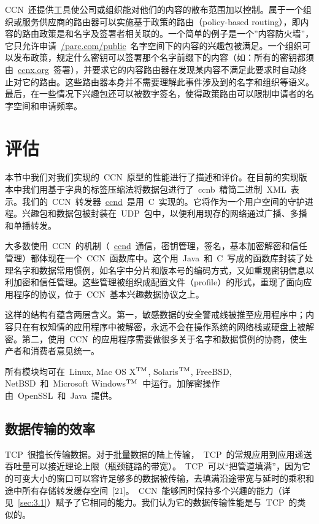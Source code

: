 CCN~还提供工具使公司或组织能对他们的内容的散布范围加以控制。属于一个组织或服务供应商的路由器可以实施基于政策的路由（policy-based routing），即内容的路由政策是和名字及签署者相关联的。一个简单的例子是一个”内容防火墙”，它只允许申请~\url{/parc.com/public}~名字空间下的内容的兴趣包被满足。一个组织可以发布政策，规定什么密钥可以签署那个名字前缀下的内容（如：所有的密钥都须由~\url{ccnx.org}~签署），并要求它的内容路由器在发现某内容不满足此要求时自动终止对它的路由。这些路由器本身并不需要理解此事件涉及到的名字和组织等语义。最后，在一些情况下兴趣包还可以被数字签名，使得政策路由可以限制申请者的名字空间和申请频率。

\section{评估}
\label{sec:6}
本节中我们对我们实现的~CCN~原型的性能进行了描述和评价。在目前的实现版本中我们用基于字典的标签压缩法将数据包进行了~ccnb~精简二进制~XML~表示。我们的~CCN~转发器~\url{ccnd}~是用~C~实现的。它将作为一个用户空间的守护进程。兴趣包和数据包被封装在~UDP~包中，以便利用现存的网络通过广播、多播和单播转发。

大多数使用~CCN~的机制（~\url{ccnd}~通信，密钥管理，签名，基本加密解密和信任管理）都体现在一个~CCN~函数库中。这个用~Java~和~C~写成的函数库封装了处理名字和数据常用惯例，如名字中分片和版本号的编码方式，又如重现密钥信息以利加密和信任管理。这些管理被组织成配置文件（profile）的形式，重现了面向应用程序的协议，位于~CCN~基本兴趣数据协议之上。

这样的结构有蕴含两层含义。第一，敏感数据的安全警戒线被推至应用程序中；内容只在有权知情的应用程序中被解密，永远不会在操作系统的网络栈或硬盘上被解密。第二，使用~CCN~的应用程序需要做很多关于名字和数据惯例的协商，使生产者和消费者意见统一。

\def\tm{\leavevmode\hbox{$\rm {}^{TM}$}} %
所有模块均可在~Linux, Mac OS X\tm, Solaris\tm, FreeBSD, NetBSD~和~Microsoft Windows\tm~中运行。加解密操作由~OpenSSL~和~Java~提供。

\subsection{数据传输的效率}
\label{sec:6.1}
TCP~很擅长传输数据。对于批量数据的陆上传输，~TCP~的常规应用到应用递送吞吐量可以接近理论上限（瓶颈链路的带宽）。~TCP~可以“把管道填满”，因为它的可变大小的窗口可以容许足够多的数据被传输，去填满沿途带宽与延时的乘积和途中所有存储转发缓存空间~[21]。~CCN~能够同时保持多个兴趣的能力（详见~\ref{sec:3.1}）赋予了它相同的能力。我们认为它的数据传输性能是与~TCP~的类似的。

